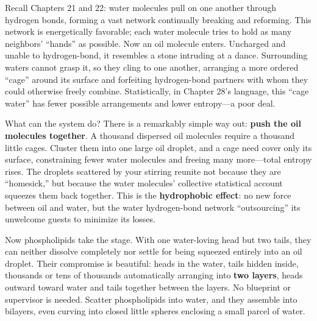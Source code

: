 Recall Chapters 21 and 22: water molecules pull on one another through hydrogen bonds, forming a vast network continually breaking and reforming. This network is energetically favorable; each water molecule tries to hold as many neighbors' ``hands'' as possible. Now an oil molecule enters. Uncharged and unable to hydrogen-bond, it resembles a stone intruding at a dance. Surrounding waters cannot grasp it, so they cling to one another, arranging a more ordered ``cage'' around its surface and forfeiting hydrogen-bond partners with whom they could otherwise freely combine. Statistically, in Chapter 28's language, this ``cage water'' has fewer possible arrangements and lower entropy---a poor deal.

What can the system do? There is a remarkably simple way out: \textbf{push the oil molecules together}. A thousand dispersed oil molecules require a thousand little cages. Cluster them into one large oil droplet, and a cage need cover only its surface, constraining fewer water molecules and freeing many more---total entropy rises. The droplets scattered by your stirring reunite not because they are ``homesick,'' but because the water molecules' collective statistical account squeezes them back together. This is the \textbf{hydrophobic effect}: no new force between oil and water, but the water hydrogen-bond network ``outsourcing'' its unwelcome guests to minimize its losses.

Now phospholipids take the stage. With one water-loving head but two tails, they can neither dissolve completely nor settle for being squeezed entirely into an oil droplet. Their compromise is beautiful: heads in the water, tails hidden inside, thousands or tens of thousands automatically arranging into \textbf{two layers}, heads outward toward water and tails together between the layers. No blueprint or supervisor is needed. Scatter phospholipids into water, and they assemble into bilayers, even curving into closed little spheres enclosing a small parcel of water.

\begin{center}
\end{center}

